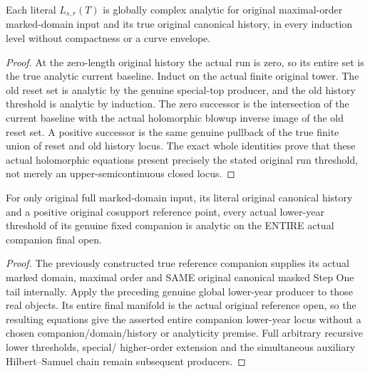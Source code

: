 \begin{theorem}
\label{hir:original-step-one-history-year-global-analytic-producer}
\leanok
{}
Each literal $L_{s,r}(T)$ is globally complex analytic for original
maximal-order marked-domain input and its true original canonical history,
in every induction level without compactness or a curve envelope.
\end{theorem}
\begin{proof}
At the zero-length original history the actual run is zero, so its entire
set is the true analytic current baseline. Induct on the actual finite
original tower. The old reset set is analytic by the genuine special-top
producer, and the old history threshold is analytic by induction. The
zero successor is the intersection of the current baseline with the
actual holomorphic blowup inverse image of the old reset set. A positive
successor is the same genuine pullback of the true finite union of reset
and old history locus. The exact whole identities prove that these actual
holomorphic equations present precisely the stated original run threshold,
not merely an upper-semicontinuous closed locus.
\end{proof}

\begin{corollary}
\label{hir:original-full-positive-companion-lower-history-year-analytic-consumer}
\leanok
{}
For only original full marked-domain input, its literal original canonical
history and a positive original cosupport reference point, every actual
lower-year threshold of its genuine fixed companion is analytic on the
ENTIRE actual companion final open.
\end{corollary}
\begin{proof}
The previously constructed true reference companion supplies its actual
marked domain, maximal order and SAME original canonical masked Step One
tail internally. Apply the preceding genuine global lower-year producer
to those real objects. Its entire final manifold is the actual original
reference open, so the resulting equations give the asserted entire
companion lower-year locus without a chosen companion/domain/history or
analyticity premise. Full arbitrary recursive lower thresholds, special/
higher-order extension and the simultaneous auxiliary Hilbert--Samuel
chain remain subsequent producers.
\end{proof}

